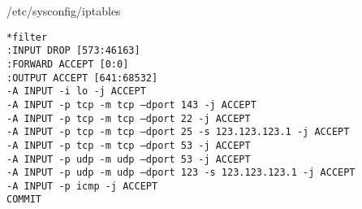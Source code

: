 \begin{frame}{/etc/sysconfig/iptables}
\begin{verbatim}
*filter 
:INPUT DROP [573:46163] 
:FORWARD ACCEPT [0:0] 
:OUTPUT ACCEPT [641:68532] 
-A INPUT -i lo -j ACCEPT 
-A INPUT -p tcp -m tcp –dport 143 -j ACCEPT 
-A INPUT -p tcp -m tcp –dport 22 -j ACCEPT 
-A INPUT -p tcp -m tcp –dport 25 -s 123.123.123.1 -j ACCEPT 
-A INPUT -p tcp -m tcp –dport 53 -j ACCEPT 
-A INPUT -p udp -m udp –dport 53 -j ACCEPT 
-A INPUT -p udp -m udp –dport 123 -s 123.123.123.1 -j ACCEPT 
-A INPUT -p icmp -j ACCEPT 
COMMIT
\end{verbatim}

\end{frame} 
 
% 
%
%
%
%
%
%
%
%



